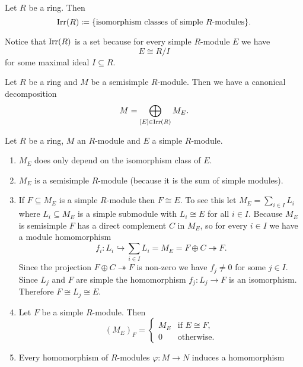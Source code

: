 \begin{defi}
  Let $R$ be a ring.
  Then
  \[
              \operatorname{Irr}(R)
    \coloneqq \{\text{isomorphism classes of simple $R$-modules}\}.
  \]
\end{defi}


Notice that $\operatorname{Irr}(R)$ is a set because for every simple $R$-module $E$ we have
\[
        E
  \cong R/I
\]
for some maximal ideal $I \subseteq R$.


\begin{cor}\label{cor: canonical decomposition semisimple module}
  Let $R$ be a ring and $M$ be a semisimple $R$-module.
  Then we have a canonical decomposition
  \[
      M
    = \bigoplus_{[E] \in \operatorname{Irr}(R)} M_E.
  \]
\end{cor}


\begin{rem}
    Let $R$ be a ring, $M$ an $R$-module and $E$ a simple $R$-module.
  \begin{enumerate}[label=\emph{\alph*)},leftmargin=*]
    \item
      $M_E$ does only depend on the isomorphism class of $E$.
    \item
      $M_E$ is a semisimple $R$-module (because it is the sum of simple modules).
    \item
      If $F \subseteq M_E$ is a simple $R$-module then $F \cong E$.
      To see this let $M_E = \sum_{i \in I} L_i$ where $L_i \subseteq M_E$ is a simple submodule with $L_i \cong E$ for all $i \in I$.
      Because $M_E$ is semisimple $F$ has a direct complement $C$ in $M_E$, so for every $i \in I$ we have a module homomorphism
      \[
                            f_i
        \colon              L_i
        \hookrightarrow     \sum_{i \in I} L_i
        =                   M_E
        =                   F \oplus C
        \twoheadrightarrow  F.
      \]
      Since the projection $F \oplus C \twoheadrightarrow F$ is non-zero we have $f_j \neq 0$ for some $j \in I$.
      Since $L_j$ and $F$ are simple the homomorphism $f_j \colon L_j \to F$ is an isomorphism.
      Therefore $F \cong L_j \cong E$.
    \item
      Let $F$ be a simple $R$-module.
      Then
      \[
          (M_E)_F
        = \begin{cases}
            M_E & \text{if } E \cong F, \\
              0 & \text{otherwise}.
          \end{cases}
      \]
    \item
      Every homomorphism of $R$-modules $\varphi \colon M \to N$ induces a homomorphism

\end{enumerate}
\end{rem}
